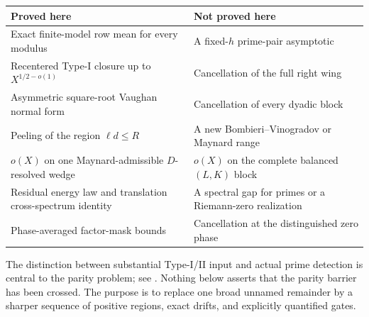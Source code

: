 \begin{center}
\small
\begin{tabular}{p{}p{}}
\toprule
Proved here & Not proved here\\
\midrule
Exact finite-model row mean for every modulus
& A fixed-$h$ prime-pair asymptotic\\
Recentered Type-I closure up to $X^{1/2-o(1)}$
& Cancellation of the full right wing\\
Asymmetric square-root Vaughan normal form
& Cancellation of every dyadic block\\
Peeling of the region $\ell d\le R$
& A new Bombieri--Vinogradov or Maynard range\\
$o(X)$ on one Maynard-admissible $D$-resolved wedge
& $o(X)$ on the complete balanced $(L,K)$ block\\
Residual energy law and translation cross-spectrum identity
& A spectral gap for primes or a Riemann-zero realization\\
Phase-averaged factor-mask bounds
& Cancellation at the distinguished zero phase\\
\bottomrule
\end{tabular}
\end{center}

The distinction between substantial Type-I/II input and actual prime
detection is central to the parity problem; see
\citet{Selberg1952Parity,Polymath2014,FordMaynard2024}.  Nothing below
asserts that the parity barrier has been crossed.  The purpose is to
replace one broad unnamed remainder by a sharper sequence of positive
regions, exact drifts, and explicitly quantified gates.
